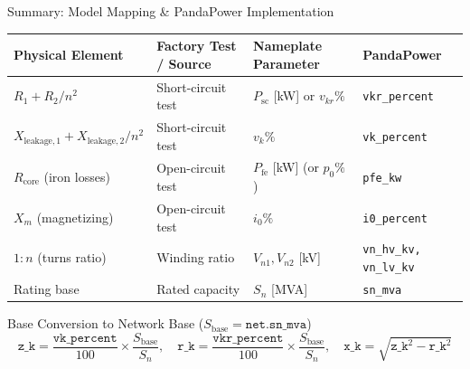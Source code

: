 \begin{frame}{Summary: Model Mapping \& PandaPower Implementation}
\small
\centering
\begin{tabular}{llll}
\toprule
\textbf{Physical Element} & \textbf{Factory Test / Source} & \textbf{Nameplate Parameter} & \textbf{PandaPower} \\
\midrule
$R_1 + R_2 / n^2$ & Short-circuit test & $P_{\text{sc}}$ [kW] or $v_{kr}\%$ & \texttt{vkr\_percent} \\
$X_{\text{leakage}, 1} + X_{\text{leakage}, 2} / n^2$ & Short-circuit test & $v_k\%$ & \texttt{vk\_percent} \\
$R_{\text{core}}$ (iron losses) & Open-circuit test & $P_{\text{fe}}$ [kW] (or $p_0\%$) & \texttt{pfe\_kw} \\
$X_m$ (magnetizing) & Open-circuit test & $i_0\%$ & \texttt{i0\_percent} \\
$1 : n$ (turns ratio) & Winding ratio & $V_{n1}, V_{n2}$ [kV] & \texttt{vn\_hv\_kv, vn\_lv\_kv} \\
Rating base & Rated capacity & $S_n$ [MVA] & \texttt{sn\_mva} \\
\bottomrule
\end{tabular}

\vspace{0.4em}
\begin{block}{Base Conversion to Network Base ($S_{\text{base}} = \texttt{net.sn\_mva}$)}
\footnotesize
$$\texttt{z\_k} = \frac{\texttt{vk\_percent}}{100} \times \frac{S_{\text{base}}}{S_n}, \quad \texttt{r\_k} = \frac{\texttt{vkr\_percent}}{100} \times \frac{S_{\text{base}}}{S_n}, \quad \texttt{x\_k} = \sqrt{\texttt{z\_k}^2 - \texttt{r\_k}^2}$$
\end{block}
\normalsize
\end{frame}

